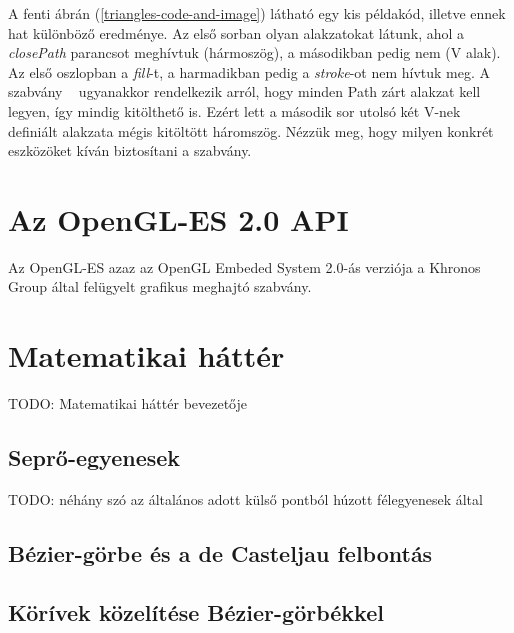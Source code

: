 \documentclass[12pt]{report}
\theoremstyle{definition}
\begin{document}
  A fenti ábrán (\ref{triangles-code-and-image}) látható egy kis példakód,
illetve ennek hat különböző eredménye. Az első sorban olyan alakzatokat látunk,
ahol a \emph{closePath} parancsot meghívtuk (hármoszög), a másodikban pedig nem
(V alak). Az első oszlopban a \emph{fill}-t, a harmadikban pedig a
\emph{stroke}-ot nem hívtuk meg. A szabvány ~\cite{Cabanier:14:HCC} ugyanakkor
rendelkezik arról, hogy minden Path zárt alakzat kell legyen, így mindig
kitölthető is. Ezért lett a második sor utolsó két V-nek definiált alakzata
mégis kitöltött háromszög.
  Nézzük meg, hogy milyen konkrét eszközöket kíván biztosítani a szabvány.

    \section[GLES2 API]{Az OpenGL-ES 2.0 API}
    \label{GLES2 API}

  Az OpenGL-ES azaz az OpenGL Embeded System 2.0-ás verziója a
Khronos Group által felügyelt grafikus meghajtó szabvány.

    \section[Matematikai háttér]{Matematikai háttér}
    \label{Matematikai háttér}

  TODO: Matematikai háttér bevezetője

    \subsection{Seprő-egyenesek}
    \label{Seprő-egyenesek}

  TODO: néhány szó az általános adott külső pontból húzott
félegyenesek által

    \subsection{Bézier-görbe és a de Casteljau felbontás}
    \label{Bézier-görbe és a de Casteljau felbontás}

    \subsection{Körívek közelítése Bézier-görbékkel}
    \label{}

\end{document}
